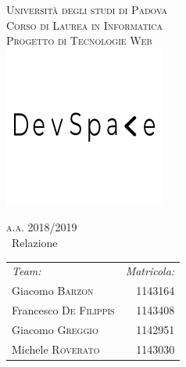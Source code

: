 \begin{titlepage} %
	\begin{center} %

		
		\textsc{\LARGE Università degli studi di Padova}\\[1.5cm]
		
		\textsc{\Large Corso di Laurea in Informatica}\\[0.5cm]
		
		\textsc{\Large Progetto di Tecnologie Web}\\[0.5cm]
		
		\includegraphics[scale=1.5]{img/logo_original.png}
		
		\textsc{\large a.a. 2018/2019}\\[0.5cm] %
		
		
		{\huge\ Relazione}\\[0.4cm] %
		
		
	 	\large
			\begin{tabular}{l r}
				\emph{Team:} & \emph{Matricola:} \\
				Giacomo \textsc{Barzon} & 1143164 \\
				Francesco \textsc{De Filippis} & 1143408 \\
				Giacomo \textsc{Greggio} & 1142951 \\
				Michele \textsc{Roverato} & 1143030 \\
			\end{tabular}
	\end{center}
\end{titlepage}
